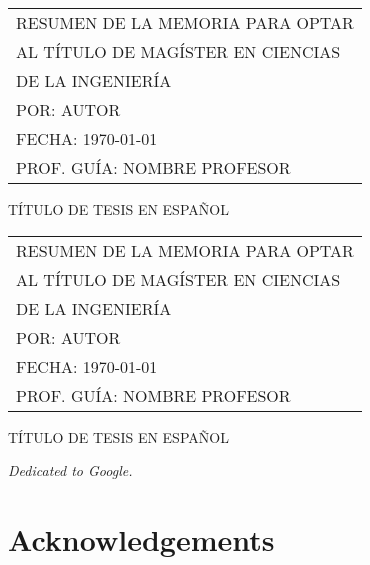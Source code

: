 \documentclass[
	12pt,
	letterpaper,
  oneside
  ]{book}
\makeatletter
\newenvironment{preliminary}%
  {\pagestyle{plain}\pagenumbering{roman}}%
  {\cleardoublepage\pagenumbering{arabic}}
\newenvironment{dedication}%
  {
  \if@openright\cleardoublepage\else\clearpage\fi
  \vspace*{\stretch{1}}
  \itshape
  \raggedleft
  \begingroup}%
  {\par\vspace{\stretch{3}}\endgroup\newpage}
\newenvironment{acknowledgements}%
  {\if@openright\cleardoublepage\else\clearpage\fi

  \chapter*{Acknowledgements}

   \begingroup}%
  {\par\endgroup\newpage}
\makeatother
\begin{document}
  \newpage
  
  \begin{preliminary}
  
  
  \setcounter{page}{2}

  \begin{tabular}{l}
		RESUMEN DE LA MEMORIA PARA OPTAR \\
		AL TÍTULO DE MAGÍSTER EN CIENCIAS \\
		DE LA INGENIERÍA \\
		POR: \MakeUppercase{Autor} \\
		FECHA: \MakeUppercase{\today} \\
		PROF. GUÍA: NOMBRE PROFESOR
	\end{tabular}

  \begin{center}
    \MakeUppercase{Título de tesis en español}
  \end{center}
  \lipsum[1-2]

  \newpage

  \begin{tabular}{l}
		RESUMEN DE LA MEMORIA PARA OPTAR \\
		AL TÍTULO DE MAGÍSTER EN CIENCIAS \\
		DE LA INGENIERÍA \\
		POR: \MakeUppercase{Autor} \\
		FECHA: \MakeUppercase{\today} \\
		PROF. GUÍA: NOMBRE PROFESOR
	\end{tabular}

  \begin{center}
    \MakeUppercase{Título de tesis en español}
  \end{center}
  \lipsum[1-2]

  \newpage

  \begin{dedication}
    Dedicated to Google.
  \end{dedication}

  \newpage

  \begin{acknowledgements}
    \lipsum[1-2]
  \end{acknowledgements}

  \tableofcontents

  \listoftables

  \listoffigures

\end{preliminary}


\end{document}

